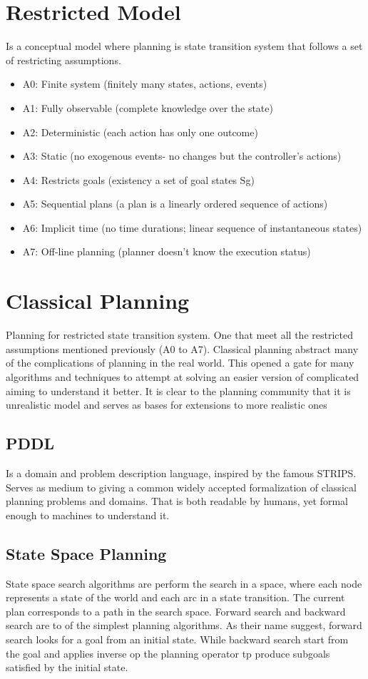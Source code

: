 \documentclass
[a4paper
,english
,parskip=half
,bibliography=totoc
]{scrreprt}
\begin{document}
    \section{Restricted Model} \label{}
    Is a conceptual model where planning is state transition system that follows a set of restricting assumptions.
    \begin{itemize}
    \item A0: Finite system       (finitely many states, actions, events)
    \item A1: Fully observable    (complete knowledge over the state)
    \item A2: Deterministic       (each action has only one outcome)
    \item A3: Static              (no exogenous events- no changes but the controller’s actions)
    \item A4: Restricts goals    (existency a set of goal states Sg)
    \item A5: Sequential plans    (a plan is a linearly ordered sequence of actions)
    \item A6: Implicit time       (no time durations; linear sequence of instantaneous states)
    \item A7: Off-line planning   (planner doesn’t know the execution status)
    \end{itemize}


    \section{Classical Planning} \label{classical_planning}
    Planning for restricted state transition system. One that meet all the restricted assumptions mentioned previously (A0 to A7). Classical planning abstract many of the complications of planning in the real world. This opened a gate for many algorithms and techniques to attempt at solving an easier version of complicated aiming to understand it better. It is clear to the planning community that it is unrealistic model and serves as bases for extensions to more realistic ones
        \subsection{PDDL}
        Is a domain and problem description language, inspired by the famous STRIPS.  Serves as medium to giving a common widely accepted formalization of classical planning problems and domains. That is both readable by humans, yet formal enough to machines to understand it.  
        \subsection{State Space Planning}
        State space search algorithms are perform the search in a space, where each node represents a state of the world and each arc in a state transition. The current plan corresponds to a path in the search space.
        Forward search and backward search are to of the simplest planning algorithms. As their name suggest, forward search looks for a goal from an initial state. While backward search start from the goal and applies inverse op the planning operator tp produce subgoals satisfied by the initial state.
\end{document}
